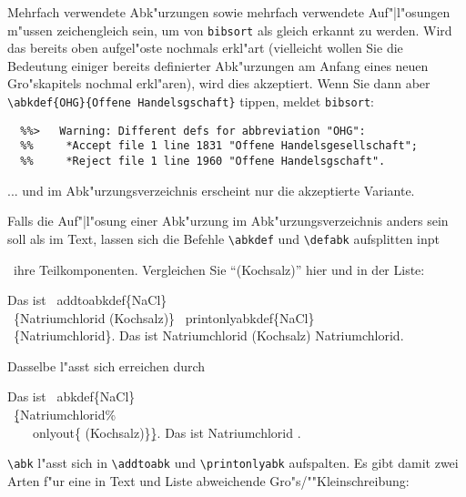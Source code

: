 \documentclass[12pt,a4paper]{article}
\newcommand{\pdfko}[1]{\kern #1pt
                          \strut\ignorespaces}%
\newcommand{\pbs}{\string\ \unskip}
\newcommand{\bs}{\protect\pbs}
\begin{document}
\noindent
Mehrfach verwendete Abk"urzungen sowie mehrfach verwendete Auf"|l"osungen
m"ussen zeichengleich sein, um von \verb|bibsort| als gleich erkannt zu
werden. Wird das bereits oben aufgel"oste 
nochmals erkl"art (vielleicht wollen Sie die Bedeutung einiger bereits definierter
Abk"urzungen am Anfang eines neuen Gro"skapitels nochmal erkl"aren),
wird dies akzeptiert. Wenn Sie dann aber \verb|\abkdef{OHG}{Offene Handelsgschaft}| 
tippen, meldet \verb|bibsort|:

\vspace{-.5ex}
{\scriptsize\begin{verbatim}
  %%>   Warning: Different defs for abbreviation "OHG":
  %%     *Accept file 1 line 1831 "Offene Handelsgesellschaft";
  %%     *Reject file 1 line 1960 "Offene Handelsgschaft".
\end{verbatim}}

\vspace{-1ex}\noindent
... und im Abk"urzungsverzeichnis erscheint nur die akzeptierte Variante.


\vspace{1ex}\noindent
Falls die Auf"|l"osung einer Abk"urzung im Abk"urzungsverzeichnis anders sein
soll als im Text, lassen sich die Befehle \verb|\abkdef| und \verb|\defabk|
aufsplitten in\pdfko{1.25}\ 
ihre Teilkomponenten. Vergleichen Sie "`(Kochsalz)"' hier und in der Liste:

\Doppelbox
{\vspace{.25ex}
 Das ist \bs addtoabkdef\{NaCl\} 
 \\ \ \{Natriumchlorid (Kochsalz)\}
 \bs printonlyabkdef\{NaCl\} 
 \\ \ \{Natriumchlorid\}.
 \vspace{.25ex}
}
{Das ist  
 {Natriumchlorid (Kochsalz)}
 {Natriumchlorid}.
}

\noindent
Dasselbe l"asst sich erreichen durch

\Doppelbox
{\vspace{.25ex}
 Das ist \bs abkdef\{NaCl\} 
 \\ \ \b{\{}Natriumchlorid\%
 \\ \ \ \ \bs onlyout\{ (Kochsalz)\}\b{\}}.
}
{\vspace{1.5ex}
 Das ist  
  {Natriumchlorid%
         }.
}


\noindent
\verb|\abk| l"asst sich in \verb|\addtoabk| und 
\verb|\printonlyabk| aufspalten.
Es gibt damit zwei Arten f"ur eine in Text und Liste 
abweichende Gro"s\fhy/""Kleinschreibung:
\end{document}
